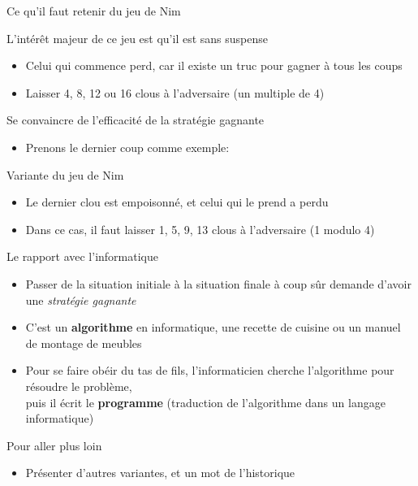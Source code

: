 \documentclass[final,hyperref={pdfpagelabels=false}]{beamer}
\begin{document}
\begin{frame}{Ce qu'il faut retenir du jeu de Nim}

  \begin{block}{L'intérêt majeur de ce jeu est qu'il est sans suspense}
    \begin{itemize}
    \item Celui qui commence perd, car il existe un truc pour gagner à tous
      les coups
    \item {} Laisser 4, 8, 12 ou 16 clous à
      l'adversaire (un multiple de 4)
    \end{itemize}
  \end{block}

  \begin{block}{Se convaincre de l'efficacité de la stratégie gagnante}
    \begin{itemize}
    \item Prenons le dernier coup comme exemple:
    \end{itemize}
  \end{block}

  \begin{block}{Variante du jeu de Nim}
    \begin{itemize}
    \item Le dernier clou est empoisonné, et celui qui le prend a perdu
    \item Dans ce cas, il faut laisser 1, 5, 9, 13 clous à l'adversaire (1
      modulo 4)
    \end{itemize}
  \end{block}

  \begin{block}{Le rapport avec l'informatique}
    \begin{itemize}
    \item Passer de la situation initiale à la situation finale à coup sûr demande d'avoir
      une \textit{stratégie gagnante}
    \item C'est un \alert{\textbf{algorithme}} en informatique, une recette de
      cuisine ou un manuel de montage de meubles
    \item Pour se faire obéir du tas de fils, l'informaticien cherche
      l'algorithme pour résoudre le problème,\\
      puis il écrit le \alert{\textbf{programme}} (traduction de l'algorithme
      dans un langage informatique)
    \end{itemize}
  \end{block}

  \begin{block}{Pour aller plus loin}
    \begin{itemize}
    \item Présenter d'autres variantes, et un mot de l'historique
    \end{itemize}
  \end{block}
\end{frame}
\end{document}
